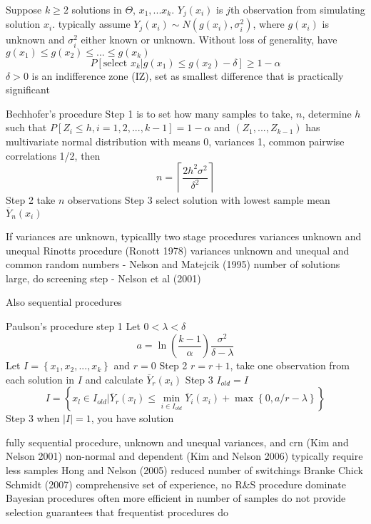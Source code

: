 Suppose $k \ge 2$ solutions in $\Theta$, $x_1, ... x_k$.  $Y_j (x_i)$ is $j$th observation from simulating solution $x_i$.  typically assume $Y_j (x_i) \sim N(g(x_i), \sigma_i^2 )$, where $g(x_i)$ is unknown and $\sigma_i^2$ either known or unknown.  Without loss of generality, have $g(x_1) \le g(x_2) \le ... \le g(x_k)$
\begin{equation}
P[ \mbox{select } x_k | g(x_1) \le g(x_2) - \delta ] \ge 1 - \alpha
\end{equation}
$\delta > 0$ is an indifference zone (IZ), set as smallest difference that is practically significant

Bechhofer's procedure
Step 1 is to set how many samples to take, $n$, determine $h$ such that $P [ Z_i \le h, i=1,2,...,k-1 ] = 1-\alpha$ and $(Z_1, ..., Z_{k-1})$ has multivariate normal distribution with means 0, variances 1, common pairwise correlations 1/2, then
\begin{equation}
n = \left\lceil \frac{ 2h^2\sigma^2}{\delta^2} \right\rceil
\end{equation}
Step 2 take $n$ observations
Step 3 select solution with lowest sample mean $\overline{Y}_n (x_i)$

If variances are unknown, typicallly two stage procedures
variances unknown and unequal Rinotts procedure (Ronott 1978)
variances unknown and unequal and common random numbers - Nelson and Matejcik (1995)
number of solutions large, do screening step - Nelson et al (2001)

Also sequential procedures

Paulson's procedure
step 1 Let $0 < \lambda < \delta$
\begin{equation}
a = \ln \left( \frac{k-1}{\alpha} \right) \frac{\sigma^2}{\delta - \lambda}
\end{equation}
Let $I = \left\{ x_1, x_2, ..., x_k \right\}$ and $r=0$
Step 2 $r = r+1$, take one observation from each solution in $I$ and calculate $\overline{Y}_r(x_i)$
Step 3 $I_{old} = I$
\begin{equation}
I = \left\{ x_l \in I_{old} | \overline{Y}_r(x_l) \le \min_{i \in I_{old}} \overline{Y}_i(x_i) + \max \left\{ 0, a/r - \lambda \right\} \right\}
\end{equation}
Step 3 when $| I | = 1$, you have solution

fully sequential procedure, unknown and unequal variances, and crn (Kim and Nelson 2001)
non-normal and dependent (Kim and Nelson 2006)
typically require less samples
Hong and Nelson (2005) reduced number of switchings
Branke Chick Schmidt (2007) comprehensive set of experience, no R\&S procedure dominate
Bayesian procedures often more efficient in number of samples
do not provide selection guarantees that frequentist procedures do



